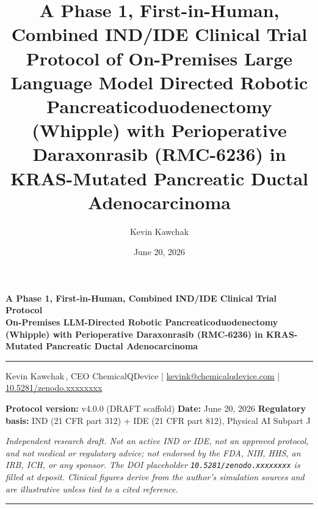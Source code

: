 \documentclass[11pt]{article}
\title{A Phase 1, First-in-Human, Combined IND/IDE Clinical Trial Protocol of
On-Premises Large Language Model Directed Robotic Pancreaticoduodenectomy
(Whipple) with Perioperative Daraxonrasib (RMC-6236) in KRAS-Mutated Pancreatic
Ductal Adenocarcinoma}
\author{Kevin Kawchak}
\date{June 20, 2026}
\begin{document}
\thispagestyle{plain}

\begin{center}
{\LARGE\bfseries\color{accentcol} A Phase 1, First-in-Human, Combined IND/IDE
Clinical Trial Protocol}\\[0.4em]
{\large\bfseries On-Premises LLM-Directed Robotic Pancreaticoduodenectomy
(Whipple) with Perioperative Daraxonrasib (RMC-6236) in KRAS-Mutated Pancreatic
Ductal Adenocarcinoma}\\[0.3em]
{\color{accentcol}\rule{\linewidth}{1.2pt}}
\end{center}

\begin{center}\small
Kevin Kawchak\,, CEO ChemicalQDevice \;|\;
\href{mailto:kevink@chemicalqdevice.com}{kevink@chemicalqdevice.com} \;|\;
\href{https://doi.org/10.5281/zenodo.xxxxxxxx}{10.5281/zenodo.xxxxxxxx}
\end{center}

\begin{center}\footnotesize
\textbf{Protocol version:} v4.0.0 (DRAFT scaffold) \quad
\textbf{Date:} June 20, 2026 \quad
\textbf{Regulatory basis:} IND (21 CFR part 312) + IDE (21 CFR part 812),
Physical AI Subpart J
\end{center}

\noindent\footnotesize\textit{Independent research draft. Not an active IND or
IDE, not an approved protocol, and not medical or regulatory advice; not endorsed
by the FDA, NIH, HHS, an IRB, ICH, or any sponsor. The DOI placeholder
\texttt{10.5281/zenodo.xxxxxxxx} is filled at deposit. Clinical figures derive
from the author's simulation sources and are illustrative unless tied to a cited
reference.}\normalsize\par

\renewcommand{\keywordname}{\textbf{Keywords}}

\vspace{0.5em}
{\color{accentcol}\rule{\linewidth}{0.6pt}}

\renewcommand{\contentsname}{\color{accentcol}Table of Contents}
{\setlength{\parskip}{0pt}\small\tableofcontents}
\clearpage














\end{document}
